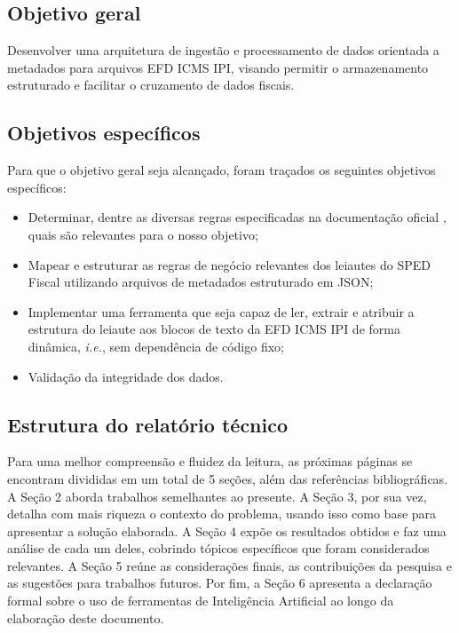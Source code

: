 \subsection{Objetivo geral}
\label{sec:introduction_objetivo_geral}
Desenvolver uma arquitetura de ingestão e processamento de dados orientada a
metadados para arquivos EFD ICMS IPI, visando permitir o armazenamento
estruturado e facilitar o cruzamento de dados fiscais.

\subsection{Objetivos específicos}
\label{sec:introduction_objetivos_especificos}
Para que o objetivo geral seja alcançado, foram traçados os seguintes objetivos específicos:
\begin{itemize}
    \item Determinar, dentre as diversas regras especificadas na documentação
    oficial \cite{guia_pratico_efd, nota_tecnica_efd}, quais são relevantes
    para o nosso objetivo;
    \item Mapear e estruturar as regras de negócio relevantes dos leiautes do
    SPED Fiscal utilizando arquivos de metadados estruturado em JSON;
    \item Implementar uma ferramenta que seja capaz de ler, extrair e atribuir
    a estrutura do leiaute aos blocos de texto da EFD ICMS IPI de forma
    dinâmica, \textit{i.e.}, sem dependência de código fixo;
    \item Validação da integridade dos dados.
\end{itemize}

\subsection{Estrutura do relatório técnico}
\label{sec:introduction_estrutura}

Para uma melhor compreensão e fluidez da leitura, as próximas páginas se
encontram divididas em um total de 5 seções, além das referências
bibliográficas. A Seção 2 aborda trabalhos semelhantes ao presente. A Seção 3,
por sua vez, detalha com mais riqueza o contexto do problema, usando isso como
base para apresentar a solução elaborada. A Seção 4 expõe os resultados obtidos
e faz uma análise de cada um deles, cobrindo tópicos específicos que foram
considerados relevantes. A Seção 5 reúne as considerações finais, as
contribuições da pesquisa e as sugestões para trabalhos futuros. Por fim, a
Seção 6 apresenta a declaração formal sobre o uso de ferramentas de Inteligência
Artificial ao longo da elaboração deste documento.